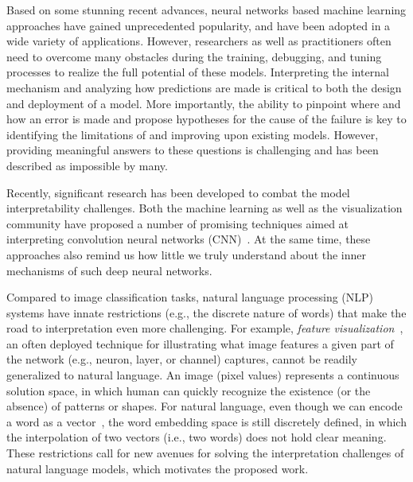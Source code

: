 \maketitle

Based on some stunning recent advances, neural networks based machine learning approaches have gained unprecedented popularity, and have been adopted in a wide variety of applications.
%
However, researchers as well as practitioners often need to overcome many obstacles during the training, debugging, and tuning processes to realize the full potential of these models.
%
Interpreting the internal mechanism and analyzing how predictions are made is critical to both the design and deployment of a model.
More importantly, the ability to pinpoint where and how an error is made and propose hypotheses for the cause of the failure is key to identifying the limitations of and improving upon existing models.
However, providing meaningful answers to these questions is challenging and has been described as impossible by many.

Recently, significant research has been developed to combat the model interpretability challenges.
Both the machine learning as well as the visualization community have proposed a number of promising techniques aimed at interpreting convolution neural networks (CNN)~\cite{SimonyanVedaldiZisserman2013, ZeilerFergus2014, YosinskiCluneNguyen2015, OlahMordvintsevSchubert2017, LiuShiLi2017, OlahSatyanarayanJohnson2018, BilalJourablooYe2018}. 
At the same time, these approaches also remind us how little we truly understand about the inner mechanisms of such deep neural networks.

Compared to image classification tasks, natural language processing (NLP) systems have innate restrictions (e.g., the discrete nature of words) that make the road to interpretation even more challenging.
For example, \emph{feature visualization}~\cite{OlahMordvintsevSchubert2017}, an often deployed technique for illustrating what image features a given part of the network (e.g., neuron, layer, or channel) captures, cannot be readily generalized to natural language. 
An image (pixel values) represents a continuous solution space, in which human can quickly recognize the existence (or the absence) of patterns or shapes. 
For natural language, even though we can encode a word as a vector~\cite{MikolovSutskeverChen2013, PenningtonSocherManning2014}, the word embedding space is still discretely defined, in which the interpolation of two vectors (i.e., two words) does not hold clear meaning.
%
These restrictions call for new avenues for solving the interpretation challenges of natural language models, which motivates the proposed work.

